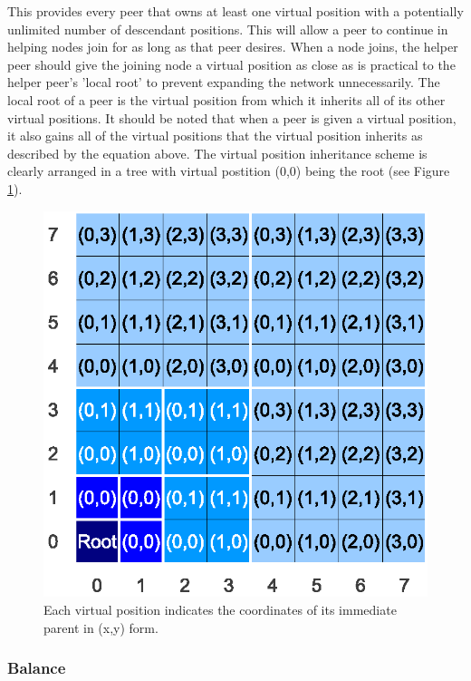 \documentclass[ %
                    author={Luke Murray},
                supervisor={Dr. Simon Hollis},
                     title={Shadow Peer-to-Peer Networks},
                  subtitle={},
                    degree={MEng},
                      year={2013} ]{thesis}
\begin{document}
This provides every peer that owns at least one virtual position with a potentially unlimited number of descendant positions. This will allow a peer to continue in helping nodes join for as long as that peer desires. When a node joins, the helper peer should give the joining node a virtual position as close as is practical to the helper peer's 'local root' to prevent expanding the network unnecessarily. The local root of a peer is the virtual position from which it inherits all of its other virtual positions. It should be noted that when a peer is given a virtual position, it also gains all of the virtual positions that the virtual position inherits as described by the equation above. The virtual position inheritance scheme is clearly arranged in a tree with virtual postition (0,0) being the root (see Figure \ref{tree}).

\begin{figure}[h]
    \centering
    \includegraphics{diagrams/network_tree.eps}
    \caption{Each virtual position indicates the coordinates of its immediate parent in (x,y) form.}
    \label{tree}
\end{figure}

\subsubsection{Balance}
\end{document}
